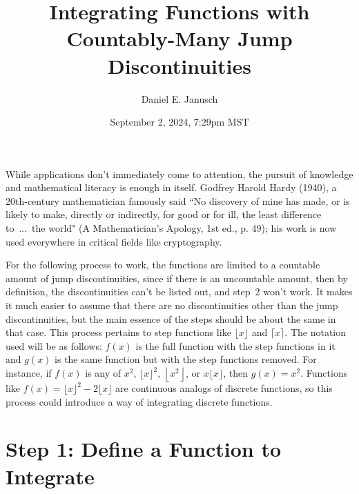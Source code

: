 \documentclass[12pt]{article}
\begin{document}
{}

\title{Integrating Functions with Countably-Many Jump Discontinuities}
\author{Daniel E. Janusch}
\date{September 2, 2024, 7:29pm MST}
\maketitle

	\indent While applications don't immediately come to attention, the pursuit of knowledge and
	mathematical literacy is enough in itself. Godfrey Harold Hardy (1940), a 20th-century
	mathematician famously said ``No discovery of mine has made, or is likely to make, directly
	or indirectly, for good or for ill, the least difference to~...~the world" (A Mathematician's
	Apology, 1st ed., p. 49); his work is now used everywhere in critical fields like cryptography.

	\indent For the following process to work, the functions are limited to a countable amount of
	jump discontinuities, since if there is an uncountable amount, then by definition, the
	discontinuities can't be listed out, and step~2 won't work. It makes it much easier to assume
	that there are no discontinuities other than the jump discontinuities, but the main essence of
	the steps should be about the same in that case. This process pertains to step functions like
	$\lfloor x\rfloor$ and $\lceil x\rceil$. The notation used will be as follows: $f(x)$ is the
	full function with the step functions in it and  $g(x)$ is the same function but with the step
	functions removed. For instance, if $f(x)$ is any of $x^2$, $\lfloor x\rfloor^2$,
	$\left\lfloor x^2\right\rfloor$, or $x\lfloor x\rfloor$, then $g(x)=x^2$. Functions like
	$f(x)=\lfloor x\rfloor^2-2\lfloor x\rfloor$ are continuous analogs of discrete functions, so
	this process could introduce a way of integrating discrete functions.

{}
\section*{Step 1: Define a Function to Integrate}
\end{document}
